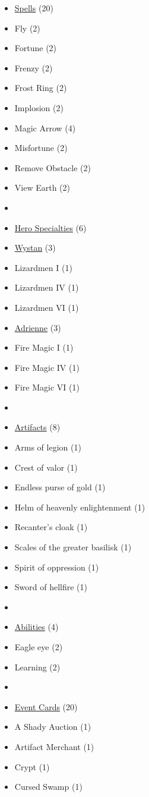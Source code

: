 \begin{multicols}{3}
\begin{itemize}[leftmargin=0pt, label={}, noitemsep, noitemsep]
  \item \underline{Spells} (20)
  \item Fly (2)
  \item Fortune (2)
  \item Frenzy (2)
  \item Frost Ring (2)
  \item Implosion (2)
  \item Magic Arrow (4)
  \item Misfortune (2)
  \item Remove Obstacle (2)
  \item View Earth (2)
  \item
  \item \underline{Hero Specialties} (6)
  \item \underline{Wystan} (3)
  \item Lizardmen I (1)
  \item Lizardmen IV (1)
  \item Lizardmen VI (1)
  \item \underline{Adrienne} (3)
  \item Fire Magic I (1)
  \item Fire Magic IV (1)
  \item Fire Magic VI (1)
  \item
  \item \underline{Artifacts} (8)
  \item Arms of legion (1)
  \item Crest of valor (1)
  \item Endless purse of gold (1)
  \item Helm of heavenly enlightenment (1)
  \item Recanter's cloak (1)
  \item Scales of the greater basilisk (1)
  \item Spirit of oppression (1)
  \item Sword of hellfire (1)
  \item
  \item \underline{Abilities} (4)
  \item Eagle eye (2)
  \item Learning (2)
  \item
  \item \underline{Event Cards} (20)
  \item A Shady Auction (1)
  \item Artifact Merchant (1)
  \item Crypt (1)
  \item Cursed Swamp (1)

\end{itemize}
\end{multicols}
